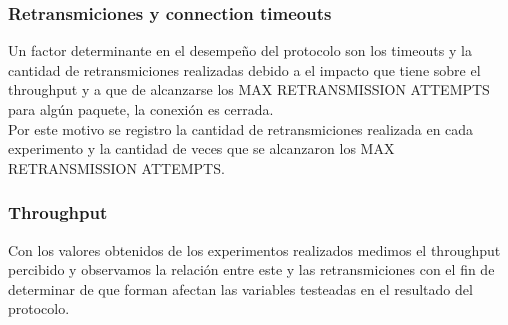 \subsubsection{Retransmiciones y connection timeouts}

Un factor determinante en el desempeño del protocolo son los timeouts y la cantidad de retransmiciones realizadas debido a el impacto que tiene sobre el throughput y a que de alcanzarse los MAX RETRANSMISSION ATTEMPTS para algún paquete, la conexión es cerrada.	\\
\indent	Por este motivo se registro la cantidad de retransmiciones realizada en cada experimento y la cantidad de veces que se alcanzaron los MAX RETRANSMISSION ATTEMPTS.

\subsubsection{Throughput}

Con los valores obtenidos de los experimentos realizados medimos el throughput percibido y observamos la relación entre este y las retransmiciones con el fin de determinar de que forman afectan las variables testeadas en el resultado del protocolo.
